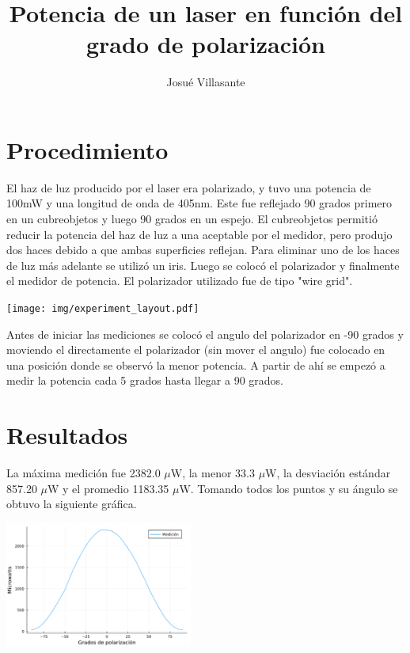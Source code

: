 \documentclass[twocolumn]{article}
\author{Josué Villasante}
\title{Potencia de un laser en función del grado de polarización}
\begin{document}
	\maketitle

	\section{Procedimiento}

		El haz de luz producido por el laser era polarizado, y tuvo una potencia de 100mW y una longitud de onda de 405nm. Este fue reflejado 90 grados primero en un cubreobjetos y luego 90 grados en un espejo. El cubreobjetos permitió reducir la potencia del haz de luz a una aceptable por el medidor, pero produjo dos haces debido a que ambas superficies reflejan. Para eliminar uno de los haces de luz más adelante se utilizó un iris. Luego se colocó el polarizador y finalmente el medidor de potencia. El polarizador utilizado fue de tipo "wire grid".

		\begin{center}
			\texttt{[image: img/experiment\_layout.pdf]}
		\end{center}

		Antes de iniciar las mediciones se colocó el angulo del polarizador en -90 grados y moviendo el directamente el polarizador (sin mover el angulo) fue colocado en una posición donde se observó la menor potencia. A partir de ahí se empezó a medir la potencia cada 5 grados hasta llegar a 90 grados.

	\section{Resultados}

		La máxima medición fue 2382.0 $\mu$W, la menor 33.3 $\mu$W, la desviación estándar 857.20 $\mu$W y el promedio 1183.35 $\mu$W. Tomando todos los puntos y su ángulo se obtuvo la siguiente gráfica.

		\begin{center}
			\includegraphics[width=175pt]{img/plot_raw.pdf}
		\end{center}
\end{document}
